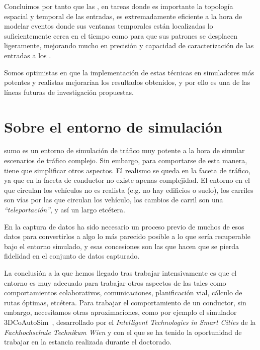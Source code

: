 Concluimos por tanto que las , en tareas donde es importante la topología espacial y temporal de las entradas, es extremadamente eficiente a la hora de modelar eventos donde sus ventanas temporales están localizadas lo suficientemente cerca en el tiempo como para que sus patrones se desplacen ligeramente, mejorando mucho en precisión y capacidad de caracterización de las entradas a los .

Somos optimistas en que la implementación de estas técnicas en simuladores más potentes y realistas mejorarían los resultados obtenidos, y por ello es una de las líneas futuras de investigación propuestas.

\section{Sobre el entorno de simulación}

\ac{sumo} es un entorno de simulación de tráfico muy potente a la hora de simular escenarios de tráfico complejo. Sin embargo, para comportarse de esta manera, tiene que simplificar otros aspectos. El realismo se queda en la faceta de tráfico, ya que en la faceta de conductor no existe apenas complejidad. El entorno en el que circulan los vehículos no es realista (e.g. no hay edificios o suelo), los carriles son vías por las que circulan los vehículo, los cambios de carril son una \textit{\enquote{teleportación}}, y así un largo etcétera.

En la captura de datos ha sido necesario un proceso previo de muchos de esos datos para convertirlos a algo lo más parecido posible a lo que sería recuperable bajo el entorno simulado, y esas concesiones son las que hacen que se pierda fidelidad en el conjunto de datos capturado.

La conclusión a la que hemos llegado tras trabajar intensivamente es que el entorno es muy adecuado para trabajar otros aspectos de las  tales como comportamientos colaborativos, comunicaciones, planificación vial, cálculo de rutas óptimas, etcétera. Para trabajar el comportamiento de un conductor, sin embargo, necesitamos otras aproximaciones, como por ejemplo el simulador 3DCoAutoSim~\cite{olaverri2018implementation}, desarrollado por el \textit{Intelligent Technologies in Smart Cities} de la \textit{Fachhochschule Technikum Wien} y con el que se ha tenido la oportunidad de trabajar en la estancia realizada durante el doctorado.